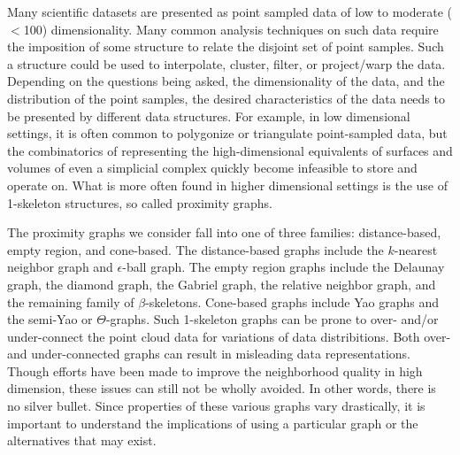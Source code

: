 Many scientific datasets are presented as point sampled data of low to moderate ($<$100) dimensionality.
%
Many common analysis techniques on such data require the imposition of some structure to relate the disjoint set of point samples.
%
Such a structure could be used to interpolate, cluster, filter, or project/warp the data.
%
Depending on the questions being asked, the dimensionality of the data, and the distribution of the point samples, the desired characteristics of the data needs to be presented by different data structures.
%
For example, in low dimensional settings, it is often common to polygonize or triangulate point-sampled data, but the combinatorics of representing the high-dimensional equivalents of surfaces and volumes of even a simplicial complex quickly become infeasible to store and operate on.
%
What is more often found in higher dimensional settings is the use of 1-skeleton structures, so called proximity graphs.

The proximity graphs we consider fall into one of three families: distance-based, empty region, and cone-based.
%
The distance-based graphs include the $k$-nearest neighbor graph and $\epsilon$-ball graph.
%
The empty region graphs include the Delaunay graph, the diamond graph, the Gabriel graph, the relative neighbor graph, and the remaining family of $\beta$-skeletons.
%
Cone-based graphs include Yao graphs and the semi-Yao or $\Theta$-graphs.
%
Such 1-skeleton graphs can be prone to over- and/or under-connect the point cloud data for variations of data distribitions.
%
Both over- and under-connected graphs can result in misleading data representations.
%
Though efforts have been made to improve the neighborhood quality in high dimension, these issues can still not be wholly avoided.
%
In other words, there is no silver bullet.
%
Since properties of these various graphs vary drastically, it is important to understand the implications of using a particular graph or the alternatives that may exist.

